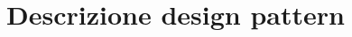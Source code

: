 \documentclass[../SpecificaTecnica.tex]{subfiles}
\begin{document}
\section{Descrizione design pattern}
	
\end{document}

